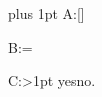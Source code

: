\documentclass{article}
\begin{document}
\newdimen\da \newskip\sa \sa=7pt plus 1pt
A:\setlength{\da}{\ifcompact\columnwidth\else\textwidth\fi}[\the\da]

B:\da=\ifdraft\else\sa\fi[\the\da]

C:\ifdim\iflong\else\da\fi>1pt yes\else no\fi.
\end{document}
